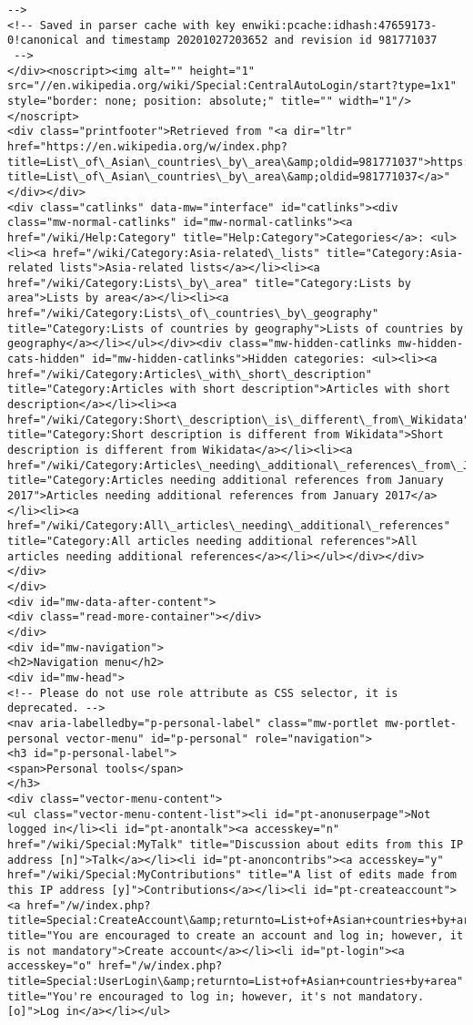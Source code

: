 \documentclass[11pt]{article}
\begin{document}
\begin{Verbatim}[commandchars=\\\{\}]
-->
<!-- Saved in parser cache with key enwiki:pcache:idhash:47659173-0!canonical and timestamp 20201027203652 and revision id 981771037
 -->
</div><noscript><img alt="" height="1" src="//en.wikipedia.org/wiki/Special:CentralAutoLogin/start?type=1x1" style="border: none; position: absolute;" title="" width="1"/></noscript>
<div class="printfooter">Retrieved from "<a dir="ltr" href="https://en.wikipedia.org/w/index.php?title=List\_of\_Asian\_countries\_by\_area\&amp;oldid=981771037">https://en.wikipedia.org/w/index.php?title=List\_of\_Asian\_countries\_by\_area\&amp;oldid=981771037</a>"</div></div>
<div class="catlinks" data-mw="interface" id="catlinks"><div class="mw-normal-catlinks" id="mw-normal-catlinks"><a href="/wiki/Help:Category" title="Help:Category">Categories</a>: <ul><li><a href="/wiki/Category:Asia-related\_lists" title="Category:Asia-related lists">Asia-related lists</a></li><li><a href="/wiki/Category:Lists\_by\_area" title="Category:Lists by area">Lists by area</a></li><li><a href="/wiki/Category:Lists\_of\_countries\_by\_geography" title="Category:Lists of countries by geography">Lists of countries by geography</a></li></ul></div><div class="mw-hidden-catlinks mw-hidden-cats-hidden" id="mw-hidden-catlinks">Hidden categories: <ul><li><a href="/wiki/Category:Articles\_with\_short\_description" title="Category:Articles with short description">Articles with short description</a></li><li><a href="/wiki/Category:Short\_description\_is\_different\_from\_Wikidata" title="Category:Short description is different from Wikidata">Short description is different from Wikidata</a></li><li><a href="/wiki/Category:Articles\_needing\_additional\_references\_from\_January\_2017" title="Category:Articles needing additional references from January 2017">Articles needing additional references from January 2017</a></li><li><a href="/wiki/Category:All\_articles\_needing\_additional\_references" title="Category:All articles needing additional references">All articles needing additional references</a></li></ul></div></div>
</div>
</div>
<div id="mw-data-after-content">
<div class="read-more-container"></div>
</div>
<div id="mw-navigation">
<h2>Navigation menu</h2>
<div id="mw-head">
<!-- Please do not use role attribute as CSS selector, it is deprecated. -->
<nav aria-labelledby="p-personal-label" class="mw-portlet mw-portlet-personal vector-menu" id="p-personal" role="navigation">
<h3 id="p-personal-label">
<span>Personal tools</span>
</h3>
<div class="vector-menu-content">
<ul class="vector-menu-content-list"><li id="pt-anonuserpage">Not logged in</li><li id="pt-anontalk"><a accesskey="n" href="/wiki/Special:MyTalk" title="Discussion about edits from this IP address [n]">Talk</a></li><li id="pt-anoncontribs"><a accesskey="y" href="/wiki/Special:MyContributions" title="A list of edits made from this IP address [y]">Contributions</a></li><li id="pt-createaccount"><a href="/w/index.php?title=Special:CreateAccount\&amp;returnto=List+of+Asian+countries+by+area" title="You are encouraged to create an account and log in; however, it is not mandatory">Create account</a></li><li id="pt-login"><a accesskey="o" href="/w/index.php?title=Special:UserLogin\&amp;returnto=List+of+Asian+countries+by+area" title="You're encouraged to log in; however, it's not mandatory. [o]">Log in</a></li></ul>

\end{Verbatim}
\end{document}
